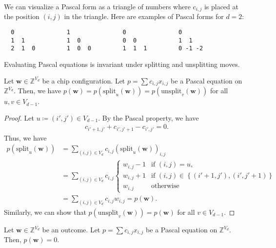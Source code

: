 \begin{example}
    We can visualize a Pascal form as a triangle of numbers where \( c_{i,j} \) is placed at the position \( (i,j) \) in the triangle. Here are examples of Pascal forms for \( d = 2 \):
    \begin{verbatim}
  0               1               0               0
  1  1            1  0            0  0            1  1
  2  1  0         1  0  0         1  1  1         0 -1 -2
    \end{verbatim}
\end{example}

Evaluating Pascal equations is invariant under splitting and unsplitting moves. 

\begin{proposition}\label{prop:pascal-invariance}
    Let \( \mathbf{w}\in \mathbb{Z}^{V_d} \) be a chip configuration. Let \( p = \sum c_{i,j}x_{i,j} \) be a Pascal equation on \( \mathbb{Z}^{V_d} \). Then,  we have \( p(\mathbf w) = p(\mathrm{split}_u(\mathbf w)) = p(\mathrm{unsplit}_{v}(\mathbf w)) \) for all \( u, v \in V_{d-1} \).
\end{proposition}

\begin{proof}
    Let \( u \coloneqq (i',j') \in V_{d-1} \).
    By the Pascal property, we have 
    \begin{align*}
        c_{i'+1,j'} + c_{i',j'+1} - c_{i',j'}= 0.
    \end{align*}
    Thus, we have 
    \begin{align*}
        p(\mathrm{split}_u(\mathbf w)) &= \sum_{(i,j) \in V_d} c_{i,j} (\mathrm{split}_u(\mathbf w))_{i,j} \\
        &= \sum_{(i,j) \in V_d} c_{i,j} \begin{cases}
            w_{i,j} - 1 & \text{if } (i,j) = u, \\
            w_{i,j} + 1 & \text{if } (i,j) \in \left\{ (i'+1,j'), (i',j'+1) \right\} \\
            w_{i,j} & \text{otherwise}
        \end{cases}\\&= \sum_{(i,j) \in V_d} c_{i,j} w_{i,j} = p(\mathbf w).
    \end{align*}
    Similarly, we can show that \( p(\mathrm{unsplit}_v(\mathbf w)) = p(\mathbf w) \) for all \( v \in V_{d-1} \).
\end{proof}

\begin{corollary}
    Let \( \mathbf{w}\in \mathbb{Z}^{V_d} \) be an outcome. Let \( p = \sum c_{i,j}x_{i,j} \) be a Pascal equation on \( \mathbb{Z}^{V_d} \). Then, \( p(\mathbf w) = 0 \).
\end{corollary}

